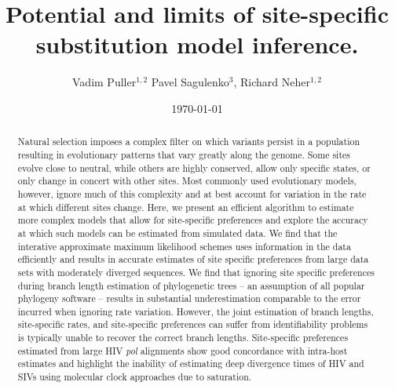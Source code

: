\documentclass[aps,rmp,twocolumn]{revtex4}
\begin{document}
\title{Potential and limits of site-specific substitution model inference.}
\author{Vadim Puller$^{1,2}$ Pavel Sagulenko$^{3}$, Richard Neher$^{1,2}$}

\date{\today}

\begin{abstract}
Natural selection imposes a complex filter on which variants persist in a population resulting in evolutionary patterns that vary greatly along the genome.
Some sites evolve close to neutral, while others are highly conserved, allow only specific states, or only change in concert with other sites.
Most commonly used evolutionary models, however, ignore much of this complexity and at best account for variation in the rate at which different sites change.
Here, we present an efficient algorithm to estimate more complex models that allow for site-specific preferences and explore the accuracy at which such models can be estimated from simulated data.
We find that the interative approximate maximum likelihood schemes uses information in the data efficiently and results in accurate  estimates of site specific preferences from large data sets with moderately diverged sequences.
We find that ignoring site specific preferences during branch length estimation of phylogenetic trees -- an assumption of all popular phylogeny software -- results in substantial underestimation comparable to the error incurred when ignoring rate variation.
However, the joint estimation of branch lengths, site-specific rates, and site-specific preferences can suffer from identifiability problems is typically unable to recover the correct branch lengths.
Site-specific preferences estimated from large HIV \emph{pol} alignments show good concordance with intra-host estimates and highlight the inability of estimating deep divergence times of HIV and SIVs using molecular clock approaches due to saturation.
\end{abstract}

\maketitle
\end{document}
